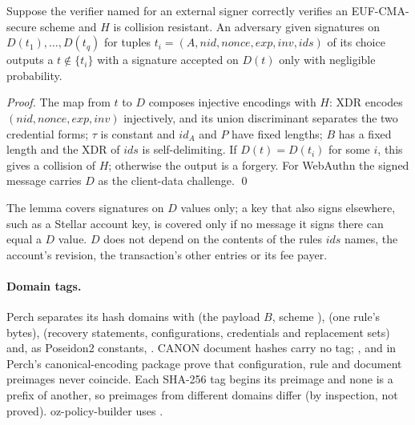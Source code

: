 \begin{lemma}[binding]\label{lem:binding}
Suppose the verifier named for an external signer correctly verifies an
EUF-CMA-secure scheme and $H$ is collision resistant. An adversary given
signatures on $D(t_1),\dots,D(t_q)$ for tuples
$t_i = (A, \mathit{nid}, \mathit{nonce}, \mathit{exp}, \mathit{inv}, \mathit{ids})$
of its choice outputs a $t \notin \{t_i\}$ with a signature accepted on $D(t)$
only with negligible probability.
\end{lemma}

\begin{proof}
The map from $t$ to $D$ composes injective encodings with $H$: XDR encodes
$(\mathit{nid}, \mathit{nonce}, \mathit{exp}, \mathit{inv})$ injectively, and its
union discriminant separates the two credential forms; $\tau$ is constant and
$\mathit{id}_A$ and $P$ have fixed lengths; $B$ has a fixed length and the XDR of $\mathit{ids}$ is
self-delimiting. If $D(t) = D(t_i)$ for some $i$, this gives a collision of $H$;
otherwise the output is a forgery. For WebAuthn the signed message carries $D$ as
the client-data challenge. \qed
\end{proof}

\noindent The lemma covers signatures on $D$ values only; a key that also signs
elsewhere, such as a Stellar account key, is covered only if no message it signs
there can equal a $D$ value. $D$ does not depend on the contents of the rules
$\mathit{ids}$ names, the account's revision, the transaction's other entries or
its fee payer.

\paragraph{Domain tags.} Perch separates its hash domains with
 (the payload $B$, scheme
),  (one rule's bytes),
 (recovery statements, configurations, credentials and
replacement sets) and, as Poseidon2 constants, . CANON
document hashes carry no tag; ,
 and  in
Perch's canonical-encoding package prove that configuration, rule and document
preimages never coincide. Each SHA-256 tag begins its preimage and none is a
prefix of another, so preimages from different domains differ (by inspection,
not proved). oz-policy-builder uses .
